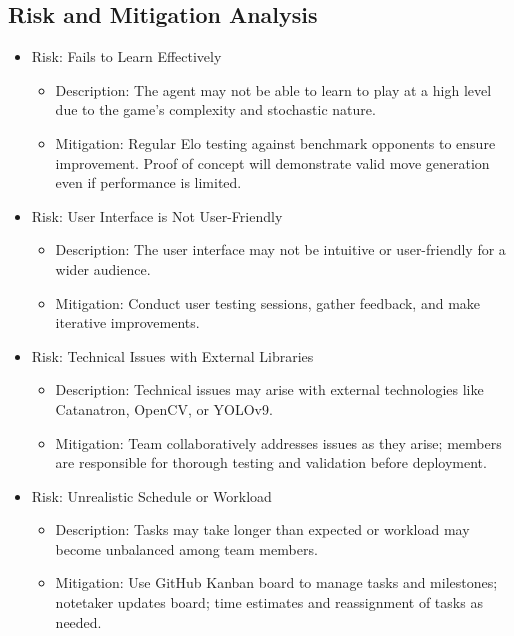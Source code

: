 \documentclass{article}
\begin{document}
\subsection{Risk and Mitigation Analysis}\label{subsec:risk}
\begin{itemize}
    \item {Risk: \AI{} Fails to Learn Effectively}
    \begin{itemize}
        \item Description: The \AI{} agent may not be able to learn to play \emph{\Catan{}} at a high level due to the game's complexity and stochastic nature.
        \item Mitigation: Regular Elo testing against benchmark opponents to ensure improvement. Proof of concept will demonstrate valid move generation even if performance is limited.
    \end{itemize}

    \item {Risk: User Interface is Not User-Friendly}
    \begin{itemize}
        \item Description: The user interface may not be intuitive or user-friendly for a wider audience.
        \item Mitigation: Conduct user testing sessions, gather feedback, and make iterative improvements.
    \end{itemize}

    \item {Risk: Technical Issues with External Libraries}
    \begin{itemize}
        \item Description: Technical issues may arise with external technologies like Catanatron, OpenCV, or YOLOv9.
        \item Mitigation: Team collaboratively addresses issues as they arise; members are responsible for thorough testing and validation before deployment.
    \end{itemize}

    \item {Risk: Unrealistic Schedule or Workload}
    \begin{itemize}
        \item Description: Tasks may take longer than expected or workload may become unbalanced among team members.
        \item Mitigation: Use GitHub Kanban board to manage tasks and milestones; notetaker updates board; time estimates and reassignment of tasks as needed.
    \end{itemize}
\end{itemize}
\end{document}

